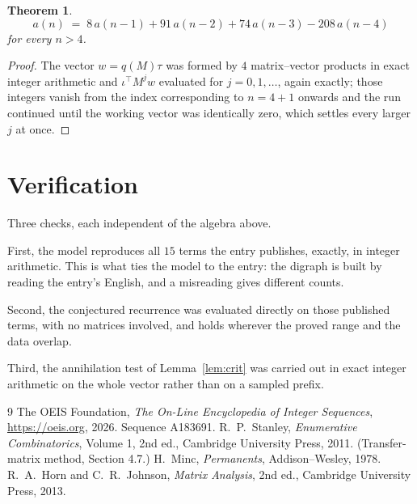 \documentclass[11pt,a4paper]{article}
\theoremstyle{plain}
\newtheorem{theorem}{Theorem}
\theoremstyle{definition}
\begin{document}
\begin{theorem}
\[
a(n)\;=\;8\,a(n-1) + 91\,a(n-2) + 74\,a(n-3) - 208\,a(n-4)
\]
for every $n>4$.
\end{theorem}

\begin{proof}
The vector $w=q(M)\tau$ was formed by $4$ matrix--vector products in exact integer
arithmetic and $\iota^{\!\top}M^{j}w$ evaluated for $j=0,1,\dots$, again exactly; those
integers vanish from the index corresponding to $n=4+1$ onwards and the run continued
until the working vector was identically zero, which settles every larger $j$ at once.
\end{proof}

\section{Verification}

Three checks, each independent of the algebra above.

First, the model reproduces all $15$ terms the entry publishes, exactly, in integer
arithmetic. This is what ties the model to the entry: the digraph is built by reading the
entry's English, and a misreading gives different counts.

Second, the conjectured recurrence was evaluated directly on those published terms, with no
matrices involved, and holds wherever the proved range and the data overlap.

Third, the annihilation test of Lemma~\ref{lem:crit} was carried out in exact integer
arithmetic on the whole vector rather than on a sampled prefix.

\begin{thebibliography}{9}
 The OEIS Foundation, \emph{The On-Line Encyclopedia of Integer
Sequences}, \url{https://oeis.org}, 2026. Sequence A183691.
 R.~P.~Stanley, \emph{Enumerative Combinatorics}, Volume 1, 2nd ed.,
Cambridge University Press, 2011. (Transfer-matrix method, Section 4.7.)
 H.~Minc, \emph{Permanents}, Addison--Wesley, 1978.
 R.~A.~Horn and C.~R.~Johnson, \emph{Matrix Analysis}, 2nd ed., Cambridge
University Press, 2013.
\end{thebibliography}
\end{document}
